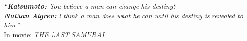 \cleardoublepage
\thispagestyle{plain}

\vspace*{8cm}

\begin{flushright}
   \textsl{``\textbf{Katsumoto:} You believe a man can change his destiny? \\
   	\textbf{Nathan Algren:} l think a man does what he can until his destiny is revealed to him.''} \\
\vspace*{1.5cm}
           In movie: \textsl{THE LAST SAMURAI} 
\end{flushright}
